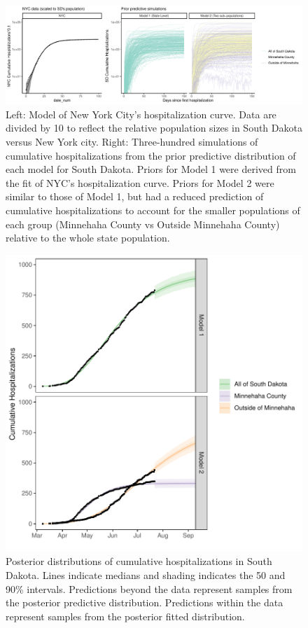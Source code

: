 \documentclass[
]{article}
\begin{document}
\begin{figure}
\centering
\includegraphics{manuscript_updates_after_submittingon7102020_files/figure-latex/plot-nyc-1.pdf}
\caption{\label{fig:plot-nyc}Left: Model of New York City's hospitalization curve. Data are divided by 10 to reflect the relative population sizes in South Dakota versus New York city. Right: Three-hundred simulations of cumulative hospitalizations from the prior predictive distribution of each model for South Dakota. Priors for Model 1 were derived from the fit of NYC's hospitalization curve. Priors for Model 2 were similar to those of Model 1, but had a reduced prediction of cumulative hospitalizations to account for the smaller populations of each group (Minnehaha County vs Outside Minnehaha County) relative to the whole state population.\label{prior:plot}}
\end{figure}

\begin{figure}
\centering
\includegraphics{manuscript_updates_after_submittingon7102020_files/figure-latex/unnamed-chunk-3-1.pdf}
\caption{\label{fig:unnamed-chunk-3}Posterior distributions of cumulative hospitalizations in South Dakota. Lines indicate medians and shading indicates the 50 and 90\% intervals. Predictions beyond the data represent samples from the posterior predictive distribution. Predictions within the data represent samples from the posterior fitted distribution.\label{post_all:plot}}
\end{figure}
\end{document}
